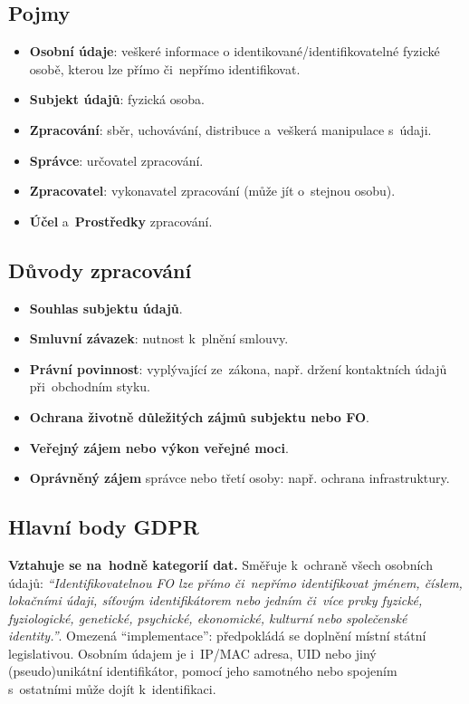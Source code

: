 \subsection*{Pojmy}

\begin{itemize}[noitemsep]
\item \textbf{Osobní údaje}: veškeré informace o identikované/identifikovatelné fyzické osobě, kterou lze přímo či~nepřímo identifikovat.
\item \textbf{Subjekt údajů}: fyzická osoba.
\item \textbf{Zpracování}: sběr, uchovávání, distribuce a~veškerá manipulace s~údaji.
\item \textbf{Správce}: určovatel zpracování.
\item \textbf{Zpracovatel}: vykonavatel zpracování (může jít o~stejnou osobu).
\item \textbf{Účel} a~\textbf{Prostředky} zpracování.
\end{itemize}

\subsection*{Důvody zpracování}

\begin{itemize}[noitemsep]
\item \textbf{Souhlas subjektu údajů}.
\item \textbf{Smluvní závazek}: nutnost k~plnění smlouvy.
\item \textbf{Právní povinnost}: vyplývající ze~zákona, např. držení kontaktních údajů při~obchodním styku.
\item \textbf{Ochrana životně důležitých zájmů subjektu nebo FO}.
\item \textbf{Veřejný zájem nebo výkon veřejné moci}.
\item \textbf{Oprávněný zájem} správce nebo třetí osoby: např. ochrana infrastruktury.
\end{itemize}

\subsection*{Hlavní body GDPR}

\textbf{Vztahuje se na~hodně kategorií dat.} Směřuje k~ochraně všech osobních údajů: \emph{\enquote{Identifikovatelnou FO lze přímo či~nepřímo identifikovat jménem, číslem, lokačními údaji, síťovým identifikátorem nebo jedním či~více prvky fyzické, fyziologické, genetické, psychické, ekonomické, kulturní nebo společenské identity.}}. Omezená \enquote{implementace}: předpokládá se doplnění místní státní legislativou. Osobním údajem je i~IP/MAC adresa, UID nebo jiný (pseudo)unikátní identifikátor, pomocí jeho samotného nebo spojením s~ostatními může dojít k~identifikaci.

